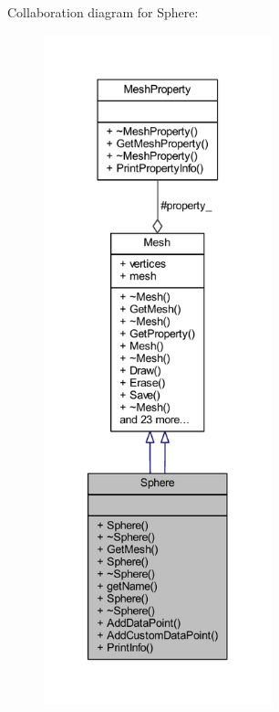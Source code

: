 Collaboration diagram for Sphere\+:\nopagebreak
\begin{figure}[H]
\begin{center}
\leavevmode
\includegraphics[height=550pt]{class_sphere__coll__graph}
\end{center}
\end{figure}
